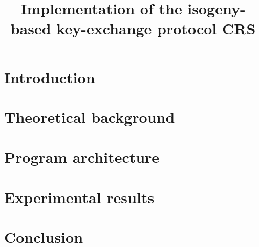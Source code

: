 \documentclass[12pt]{article}
\title{Implementation of the isogeny-based key-exchange protocol CRS}
\author{}
\date{}
\begin{document}
\maketitle
\renewcommand{\contentsname}{Table of content}
\tableofcontents
\newpage

%

\section{Introduction}


\section{Theoretical background}


\newpage
\section{Program architecture}


\newpage
\section{Experimental results}


\newpage
\section*{Conclusion}


%
\end{document}
